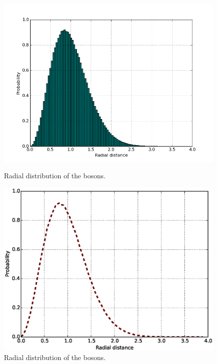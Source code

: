 \documentclass[english, a4paper]{article}
\begin{document}
\begin{figure}[H]
	\begin{minipage}[t]{0.48\linewidth}
		\includegraphics[width=\textwidth]{../modifiedMortenCode/figures/radialdistributionIe7.png}
		\caption{Radial distribution of the bosons.}
		\label{fig:onebodyDensityInteractinghist}
	\end{minipage}
	\quad
	\begin{minipage}[t]{0.48\linewidth}
		\includegraphics[width=\textwidth]{../modifiedMortenCode/figures/radialdistributionIe7curve.eps}
		\caption{Radial distribution of the bosons.}
		\label{fig:onebodyDensityInteracting}
	\end{minipage}
\end{figure}
\end{document}
